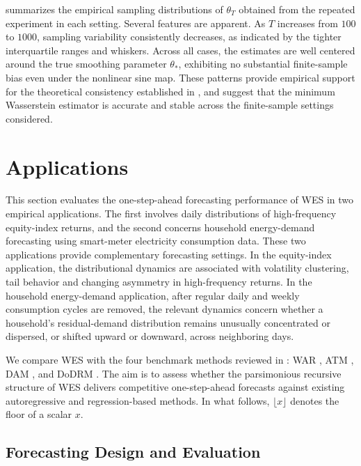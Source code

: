 \documentclass[a4paper, 11pt]{article}
\theoremstyle{definition}
\begin{document}
 summarizes the empirical sampling distributions of $\theta_T$ obtained from the repeated experiment in each setting.
Several features are apparent. 
As $T$ increases from $100$ to $1000$, sampling variability consistently decreases, as indicated by the tighter interquartile ranges and whiskers.
Across all cases, the estimates are well centered around the true smoothing parameter $\theta_*$, exhibiting no substantial finite-sample bias even under the nonlinear sine map. 
These patterns provide empirical support for the theoretical consistency established in , and suggest that the minimum Wasserstein estimator is accurate and stable across the finite-sample settings considered.



\section{Applications} \label{sec:experiment}

This section evaluates the one-step-ahead forecasting performance of WES in two empirical applications. 
The first involves daily distributions of high-frequency equity-index returns, and the second concerns household energy-demand forecasting using smart-meter electricity consumption data. 
These two applications provide complementary forecasting settings. 
In the equity-index application, the distributional dynamics are associated with volatility clustering, tail behavior and changing asymmetry in high-frequency returns. 
In the household energy-demand application, after regular daily and weekly consumption cycles are removed, the relevant dynamics concern whether a household's residual-demand distribution remains unusually concentrated or dispersed, or shifted upward or downward, across neighboring days.

We compare WES with the four benchmark methods reviewed in : WAR \citep{zhang2022wasserstein}, ATM \citep{Zhu2023}, DAM \citep{ghodrati2024distributional}, and DoDRM \citep{ghodrati2022distribution}. 
The aim is to assess whether the parsimonious recursive structure of WES delivers competitive one-step-ahead forecasts against existing autoregressive and regression-based methods.
In what follows, $\lfloor x \rfloor$ denotes the floor of a scalar $x$.

\subsection{Forecasting Design and Evaluation}
\end{document}
